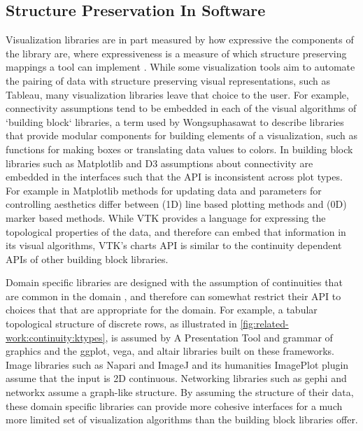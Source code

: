 \documentclass[journal]{IEEEtran}
\theoremstyle{definition}
\theoremstyle{remark}
\begin{document}
\subsection{Structure Preservation In Software}
\label{sec:related-work:software}
Visualization libraries are in part measured by how expressive the components of the library are, where expressiveness is a measure of which structure preserving mappings a tool can implement \cite{mackinlayAutomatingDesignGraphical1986}. While some visualization tools aim to automate the pairing of data with structure preserving visual representations, such as Tableau\cite{StoltePolaris2002,hanrahanVizQL2006,MackinlayShowme2007}, many visualization libraries leave that choice to the user. For example, connectivity assumptions tend to be embedded in each of the visual algorithms of `building block` libraries, a term used by Wongsuphasawat \cite{wongsuphasawatNavigatingWideWorld2021,wongsuphasawatNavigatingWideWorld2020} to describe libraries that provide modular components for building elements of a visualization, such as functions for making boxes or translating data values to colors. In building block libraries such as Matplotlib\cite{hunterMatplotlib2DGraphics2007} and D3\cite{bostockDataDrivenDocuments2011} assumptions about connectivity are embedded in the interfaces such that the API is inconsistent across plot types. For example in Matplotlib methods for updating data and parameters for controlling aesthetics differ between (1D) line based plotting methods and (0D) marker based methods. While VTK\cite{hanwellVisualizationToolkitVTK2015,geveciVTK2012} provides a language for expressing the topological properties of the data, and therefore can embed that information in its visual algorithms, VTK's charts API is similar to the continuity dependent APIs of other building block libraries.

Domain specific libraries are designed with the assumption of continuities that are common in the domain \cite{HeerSoftware2006}, and therefore can somewhat restrict their API to choices that that are appropriate for the domain. For example, a tabular topological structure of discrete rows, as illustrated in \autoref{fig:related-work:continuity:ktypes}, is assumed by
A Presentation Tool\cite{mackinlayAutomatingDesignGraphical1986, mackinlayAutomatingDesignGraphical1986} and grammar of graphics\cite{wilkinsonGrammarGraphics2005} and the ggplot\cite{wickhamGgplot2ElegantGraphics2016}, vega\cite{satyanarayanDeclarativeInteractionDesign2014}, and altair\cite{vanderplasAltairInteractiveStatistical2018} libraries built on these frameworks. Image libraries such as Napari\cite{nicholas_sofroniew_2021_4533308} and ImageJ\cite{schneiderNIHImageImageJ2012} and its humanities ImagePlot\cite{studiesCulturevisImageplot2021} plugin assume that the input is 2D continuous. Networking libraries such as gephi\cite{bastianGephiOpenSource2009} and networkx\cite{HagbergExploringNetwork2008} assume a graph-like structure. By assuming the structure of their data, these domain specific libraries can provide more cohesive interfaces for a much more limited set of visualization algorithms than the building block libraries offer.
\end{document}
